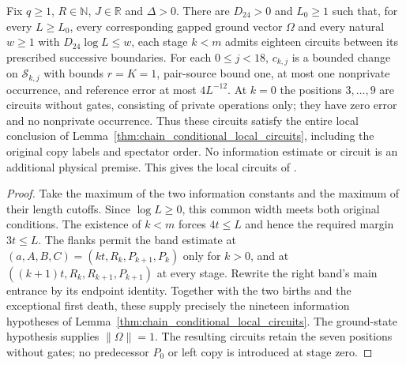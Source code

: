 \begin{lemma}
    \label{thm:chain_physical_local_circuits}
    \leanok
    Fix $q\ge1$, $R\in\mathbb N$, $J\in\mathbb R$ and $\Delta>0$.
    There are $D_{24}>0$ and $L_0\ge1$ such that, for every
    $L\ge L_0$, every corresponding gapped ground vector $\Omega$
    and every natural $w\ge1$ with
    $D_{24}\log L\le w$, each stage $k<m$ admits eighteen
    circuits between its prescribed successive boundaries.
    For each $0\le j<18$, $c_{k,j}$ is a bounded change on
    $\mathcal S_{k,j}$ with bounds $r=K=1$, pair-source bound one,
    at most one nonprivate occurrence, and reference error at most
    $4L^{-12}$. At $k=0$ the positions $3,\ldots,9$ are circuits
    without gates, consisting of private operations only; they have zero
    error and no nonprivate occurrence.
    Thus these circuits satisfy the entire local conclusion of
    Lemma~\ref{thm:chain_conditional_local_circuits}, including the
    original copy labels and spectator order. No information estimate
    or circuit is an additional physical premise. This gives the local
    circuits of \cite[Part~II, the sweep construction
        and the sweep proposition]{TNLean2026OneDimensional}.
\end{lemma}
\begin{proof}
    \leanok
    Take the maximum of the two information constants and the maximum
    of their length cutoffs. Since $\log L\ge0$, this common width
    meets both original conditions. The existence of $k<m$ forces
    $4t\le L$ and hence the required margin $3t\le L$.
    The flanks permit the band estimate at
    $(a,A,B,C)=(kt,R_k,P_{k+1},P_k)$ only for $k>0$, and at
    $((k+1)t,R_k,R_{k+1},P_{k+1})$ at every stage.
    Rewrite the right band's main entrance by its endpoint
    identity. Together with the two births and the exceptional first
    death, these supply precisely the nineteen information
    hypotheses of Lemma~\ref{thm:chain_conditional_local_circuits}.
    The ground-state hypothesis supplies $\|\Omega\|=1$.
    The resulting circuits retain the seven positions without gates; no
    predecessor $P_0$ or left copy is introduced at stage zero.
\end{proof}

